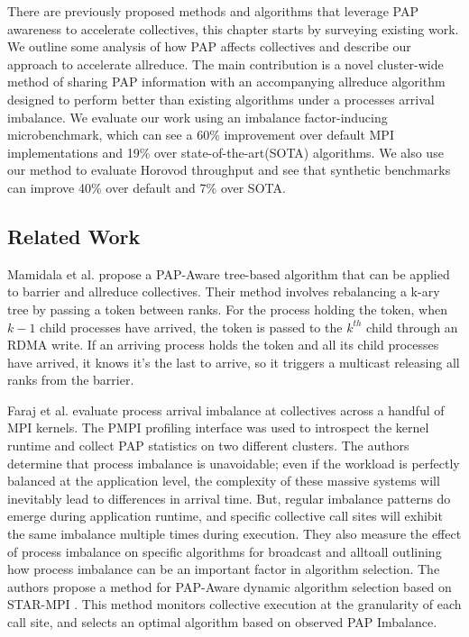 There are previously proposed methods and algorithms that leverage PAP awareness to accelerate collectives, this chapter starts by surveying existing work.
We outline some analysis of how PAP affects collectives and describe our approach to accelerate allreduce.
The main contribution is a novel cluster-wide method of sharing PAP information with an accompanying allreduce algorithm designed to perform better than existing algorithms under a processes arrival imbalance.
We evaluate our work using an imbalance factor-inducing microbenchmark, which can see a 60\% improvement over default MPI implementations and 19\% over state-of-the-art(SOTA) algorithms.
We also use our method to evaluate Horovod throughput and see that synthetic benchmarks can improve 40\% over default and 7\% over SOTA.

\subsection{Related Work}
Mamidala et al. \cite{Mamidala2004BarrierAllreduceIBAdaptive} propose a PAP-Aware tree-based algorithm that can be applied to barrier and allreduce collectives.
Their method involves rebalancing a k-ary tree by passing a token between ranks.
For the process holding the token, when $k-1$ child processes have arrived, the token is passed to the $k^{th}$ child through an RDMA write.
If an arriving process holds the token and all its child processes have arrived, it knows it's the last to arrive, so it triggers a multicast releasing all ranks from the barrier. 

Faraj et al. \cite{Faraj2008StudyProcArrivalMPIColl} evaluate process arrival imbalance at collectives across a handful of MPI kernels.
The PMPI profiling interface was used to introspect the kernel runtime and collect PAP statistics on two different clusters.
The authors determine that process imbalance is unavoidable; even if the workload is perfectly balanced at the application level, the complexity of these massive systems will inevitably lead to differences in arrival time. 
But, regular imbalance patterns do emerge during application runtime, and specific collective call sites will exhibit the same imbalance multiple times during execution.
They also measure the effect of process imbalance on specific algorithms for broadcast and alltoall outlining how process imbalance can be an important factor in algorithm selection.
The authors propose a method for PAP-Aware dynamic algorithm selection based on STAR-MPI \cite{Faraj2006StarMPI}.
This method monitors collective execution at the granularity of each call site, and selects an optimal algorithm based on observed PAP Imbalance. 

